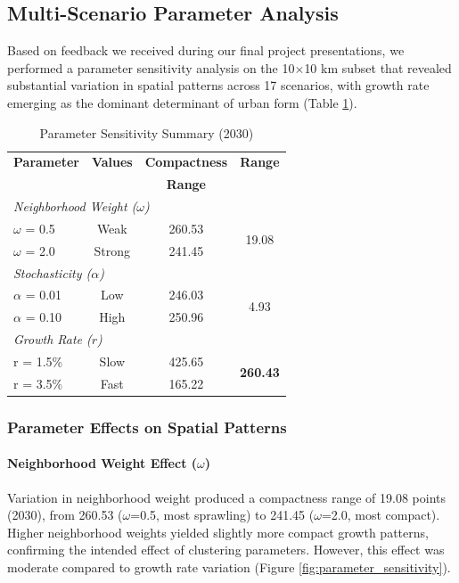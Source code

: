 \documentclass[conference]{IEEEtran}
\begin{document}
\subsection{Multi-Scenario Parameter Analysis}

Based on feedback we received during our final project presentations, we performed a parameter sensitivity analysis on the 10$\times$10 km subset that revealed substantial variation in spatial patterns across 17 scenarios, with growth rate emerging as the dominant determinant of urban form (Table \ref{tab:scenario_metrics_summary}).
\begin{table}[!t]
\caption{Parameter Sensitivity Summary (2030)}
\label{tab:scenario_metrics_summary}
\centering
\small
\renewcommand{\arraystretch}{1.2}
\begin{tabular}{lccc}
\toprule
\textbf{Parameter} & \textbf{Values} & \textbf{Compactness} & \textbf{Range} \\
 & & \textbf{Range} & \\
\midrule
\multicolumn{4}{l}{\textit{Neighborhood Weight ($\omega$)}} \\
\quad $\omega$ = 0.5 & Weak & 260.53 & \multirow{2}{*}{19.08} \\
\quad $\omega$ = 2.0 & Strong & 241.45 & \\
\midrule
\multicolumn{4}{l}{\textit{Stochasticity ($\alpha$)}} \\
\quad $\alpha$ = 0.01 & Low & 246.03 & \multirow{2}{*}{4.93} \\
\quad $\alpha$ = 0.10 & High & 250.96 & \\
\midrule
\multicolumn{4}{l}{\textit{Growth Rate ($r$)}} \\
\quad r = 1.5\% & Slow & 425.65 & \multirow{2}{*}{\textbf{260.43}} \\
\quad r = 3.5\% & Fast & 165.22 & \\
\bottomrule
\end{tabular}
\end{table}
\subsubsection{Parameter Effects on Spatial Patterns}

\paragraph{Neighborhood Weight Effect ($\omega$)}
Variation in neighborhood weight produced a compactness range of 19.08 points (2030), from 260.53 ($\omega$=0.5, most sprawling) to 241.45 ($\omega$=2.0, most compact). Higher neighborhood weights yielded slightly more compact growth patterns, confirming the intended effect of clustering parameters. However, this effect was moderate compared to growth rate variation (Figure \ref{fig:parameter_sensitivity}).
\end{document}
